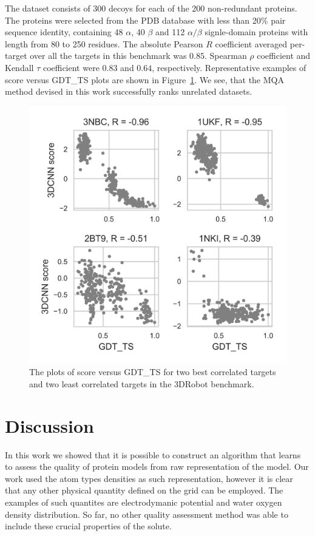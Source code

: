 \documentclass{bioinfo}
\begin{document}
The dataset consists of 300 decoys for each of the 200 non-redundant proteins. The proteins were 
selected from the PDB database with less than 20\% pair sequence identity, containing 48 $\alpha$, 
40 $\beta$ and 112 $\alpha/\beta$ signle-domain proteins with length from 80 to 250 residues. 
The absolute Pearson $R$ coefficient averaged per-target over all the
targets in this benchmark was $0.85$. Spearman $\rho$ coefficient
and Kendall $\tau$ coefficient were $0.83$ and $0.64$, respectively.
Representative examples of score versus GDT\_TS plots are shown in
Figure~\ref{Fig:3DRobotBenchmark}. We see, that the MQA method devised
in this work successfully ranks unrelated datasets.
\begin{figure}[!tpb]
    \centering
    \includegraphics[width=\linewidth]{image8.png}
    \caption{The plots of score versus GDT\_TS for two best correlated targets and two
    least correlated targets in the 3DRobot benchmark.}
    \label{Fig:3DRobotBenchmark}
\end{figure}


\section{Discussion}

In this work we showed that it is possible to construct an algorithm that learns to assess the quality of protein models from 
raw representation of the model. Our work used the atom types densities as such representation, however it is clear that 
any other physical quantity defined on the grid can be employed. The examples of such quantites are electrodymanic potential and 
water oxygen density distribution. So far, no other quality assessment method was able to include these 
crucial properties of the solute.
\end{document}

